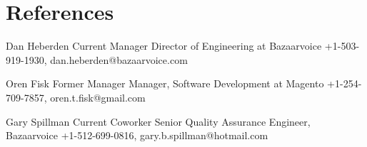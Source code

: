 \documentclass[11pt,a4paper,sans]{moderncv}
\begin{document}
\makecvtitle %


\section{References}

\cventry
{}
{Dan Heberden}
{Current Manager}
{Director of Engineering at Bazaarvoice}
{}
{+1-503-919-1930, dan.heberden@bazaarvoice.com}

\cventry
{}
{Oren Fisk}
{Former Manager}
{Manager, Software Development at Magento}
{}
{+1-254-709-7857, oren.t.fisk@gmail.com}

\cventry
{}
{Gary Spillman}
{Current Coworker}
{Senior Quality Assurance Engineer, Bazaarvoice}
{}
{+1-512-699-0816, gary.b.spillman@hotmail.com}
{}


\end{document}
